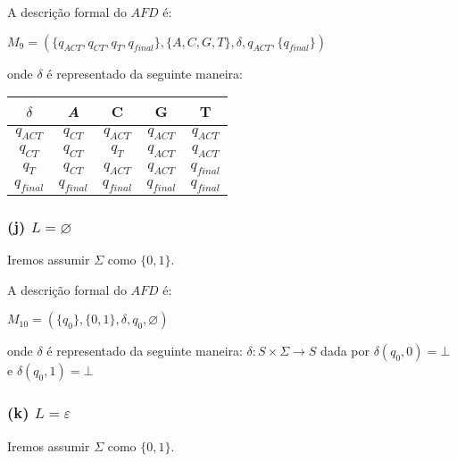 \documentclass{article}
\begin{document}
A descrição formal do $AFD$ é:
\begin{center}
  $M_9 = (\{q_{ACT},q_{CT},q_{T},q_{final}\}, \{A,C,G,T\},\delta,q_{ACT}, \{q_{final}\})$
\end{center}
onde $\delta$ é representado da seguinte maneira:

\begin{table}[htbp]
  \centering
  \begin{tabular}{c|cccc}
    \textit{$\delta$} & \textit{A}  & C           & G           & T           \\ \hline
    $q_{ACT}$         & $q_{CT}$    & $q_{ACT}$   & $q_{ACT}$   & $q_{ACT}$   \\
    $q_{CT}$          & $q_{CT}$    & $q_{T}$     & $q_{ACT}$   & $q_{ACT}$   \\
    $q_{T}$           & $q_{CT}$    & $q_{ACT}$   & $q_{ACT}$   & $q_{final}$ \\
    $q_{final}$       & $q_{final}$ & $q_{final}$ & $q_{final}$ & $q_{final}$
  \end{tabular}
\end{table}

\subsubsection*{(j) $L = \varnothing $}
Iremos assumir $\Sigma$ como $\{0,1\}$.

\begin{center}
\end{center}

A descrição formal do $AFD$ é:
\begin{center}
  $M_{10} = (\{q_{0}\}, \{0,1\},\delta,q_{0}, \varnothing)$
\end{center}
onde $\delta$ é representado da seguinte maneira: $\delta:S\times \Sigma\to S$ dada por $\delta(q_0,0)=\bot$ e $\delta(q_0,1)=\bot$

\subsubsection*{(k) $L = {\varepsilon}$ }

Iremos assumir $\Sigma$ como $\{0,1\}$.

\begin{center}
\end{center}
\end{document}
